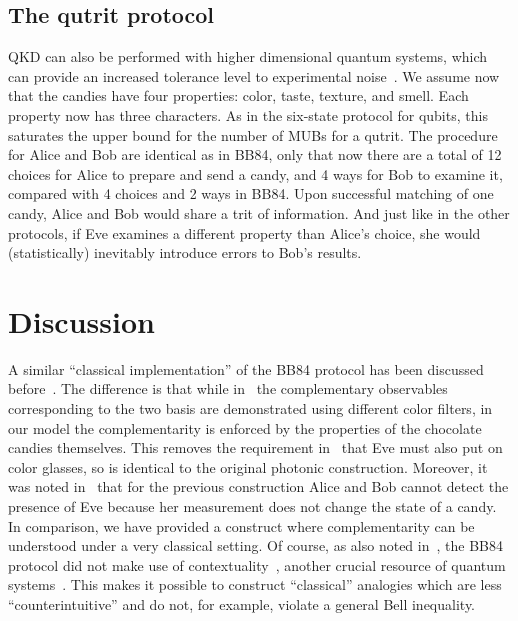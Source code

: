 \documentclass{article}
\begin{document}
\subsection{The qutrit protocol}
QKD can also be performed with higher dimensional quantum systems, which can provide an increased tolerance level to experimental noise~\cite{bechmann2000quantum}.
We assume now that the candies have four properties: color, taste, texture, and smell.
Each property now has three characters.
As in the six-state protocol for qubits, this saturates the upper bound for the number of MUBs for a qutrit.
The procedure for Alice and Bob are identical as in BB84, only that now there are a total of 12 choices for Alice to prepare and send a candy, and 4 ways for Bob to examine it, compared with 4 choices and 2 ways in BB84.
Upon successful matching of one candy, Alice and Bob would share a trit of information.
And just like in the other protocols, if Eve examines a different property than Alice's choice, she would (statistically) inevitably introduce errors to Bob's results.

\section{Discussion}
A similar ``classical implementation'' of the BB84 protocol has been discussed before~\cite{svozil2006staging,Svozil2014}. 
The difference is that while in~\cite{svozil2006staging} the complementary observables corresponding to the two basis are demonstrated using different color filters, in our model the complementarity is enforced by the properties of the chocolate candies themselves.
This removes the requirement in~\cite{svozil2006staging} that Eve must also put on color glasses, so is identical to the original photonic construction.
Moreover, it was noted in~\cite{Svozil2014} that for the previous construction Alice and Bob cannot detect the presence of Eve because her measurement does not change the state of a candy.
In comparison, we have provided a construct where complementarity can be understood under a very classical setting.
Of course, as also noted in~\cite{Svozil2014}, the BB84 protocol did not make use of contextuality~\cite{kochen1975problem,bell2001problem}, another crucial resource of quantum systems~\cite{howard2014contextuality}.
This makes it possible to construct ``classical'' analogies which are less ``counterintuitive'' and do not, for example, violate a general Bell inequality.
\end{document}
